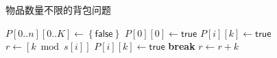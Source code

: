 \documentclass[answers]{exam}
\begin{document}
\begin{questions}
\begin{solution}
        \begin{algorithm}[H]
            \caption{物品数量不限的背包问题}
            \begin{algorithmic}[1]
                \State $P[0..n][0..K] \gets \left\{ \mathsf{false} \right\}$
                \State $P[0][0] \gets \mathsf{true}$
                            \State $P[i][k] \gets \mathsf{true}$
                        \Else
                            \State $r \gets \left[ k \bmod s[i] \right]$
                                    \State $P[i][k] \gets \mathsf{true}$
                                    \State \textbf{break}
                                \EndIf
                                \State $r \gets r + k$
                            \EndWhile
                        \EndIf
                    \EndFor
                \EndFor
            \end{algorithmic}
        \end{algorithm}

    \end{solution}

\end{questions}
\end{document}
